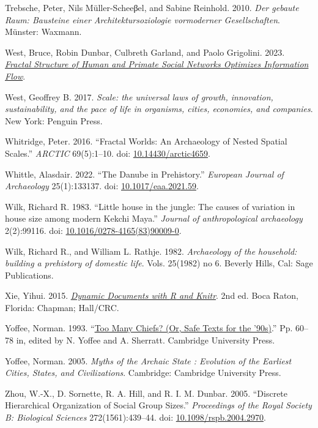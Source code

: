\documentclass[
  12pt,
]{book}
\newlength{\cslhangindent}
\newlength{\cslentryspacingunit} %
\newenvironment{CSLReferences}[2] %
 {%
  \setlength{\parindent}{0pt}
  \ifodd #1
  \let\oldpar\par
  \def\par{\hangindent=\cslhangindent\oldpar}
  \fi
  \setlength{\parskip}{#2\cslentryspacingunit}
 }%
 {}
\begin{document}
\begin{CSLReferences}{1}{0}
\leavevmode{}%
Trebsche, Peter, Nils Müller-Scheeβel, and Sabine Reinhold. 2010. \emph{Der gebaute Raum: Bausteine einer Architektursoziologie vormoderner Gesellschaften}. Münster: Waxmann.

\leavevmode{}%
West, Bruce, Robin Dunbar, Culbreth Garland, and Paolo Grigolini. 2023. \emph{\href{https://doi.org/10.1101/2023.02.23.529431}{Fractal Structure of Human and Primate Social Networks Optimizes Information Flow}}.

\leavevmode{}%
West, Geoffrey B. 2017. \emph{Scale: the universal laws of growth, innovation, sustainability, and the pace of life in organisms, cities, economies, and companies}. New York: Penguin Press.

\leavevmode{}%
Whitridge, Peter. 2016. {``Fractal Worlds: An Archaeology of Nested Spatial Scales.''} \emph{ARCTIC} 69(5):1--10. doi: \href{https://doi.org/10.14430/arctic4659}{10.14430/arctic4659}.

\leavevmode{}%
Whittle, Alasdair. 2022. {``The Danube in Prehistory.''} \emph{European Journal of Archaeology} 25(1):133137. doi: \href{https://doi.org/10.1017/eaa.2021.59}{10.1017/eaa.2021.59}.

\leavevmode{}%
Wilk, Richard R. 1983. {``Little house in the jungle: The causes of variation in house size among modern Kekchi Maya.''} \emph{Journal of anthropological archaeology} 2(2):99116. doi: \href{https://doi.org/10.1016/0278-4165(83)90009-0}{10.1016/0278-4165(83)90009-0}.

\leavevmode{}%
Wilk, Richard R., and William L. Rathje. 1982. \emph{Archaeology of the household: building a prehistory of domestic life}. Vols. 25(1982) no 6. Beverly Hills, Cal: Sage Publications.

\leavevmode{}%
Xie, Yihui. 2015. \emph{\href{http://yihui.name/knitr/}{Dynamic Documents with {R} and Knitr}}. 2nd ed. Boca Raton, Florida: Chapman; Hall/CRC.

\leavevmode{}%
Yoffee, Norman. 1993. {``\href{https://doi.org/10.1017/CBO9780511720277.007}{Too Many Chiefs? (Or, Safe Texts for the '90s)}.''} Pp. 60--78 in, edited by N. Yoffee and A. Sherratt. Cambridge University Press.

\leavevmode{}%
Yoffee, Norman. 2005. \emph{Myths of the Archaic State : Evolution of the Earliest Cities, States, and Civilizations}. Cambridge: Cambridge University Press.

\leavevmode{}%
Zhou, W.-X., D. Sornette, R. A. Hill, and R. I. M. Dunbar. 2005. {``Discrete Hierarchical Organization of Social Group Sizes.''} \emph{Proceedings of the Royal Society B: Biological Sciences} 272(1561):439--44. doi: \href{https://doi.org/10.1098/rspb.2004.2970}{10.1098/rspb.2004.2970}.

\end{CSLReferences}
\end{document}
